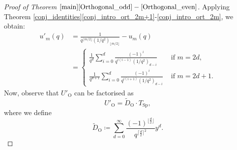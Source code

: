 \documentclass[a4paper, 12pt, oneside]{amsart}
\theoremstyle{definition}
\DeclareMathOperator{\Sp}{Sp}
\DeclareMathOperator{\Or}{O}
\begin{document}
\begin{proof}[Proof of Theorem $\ref{main}\eqref{Orthogonal_odd}-\eqref{Orthogonal_even}$]
 Applying Theorem \ref{conj_identities}\eqref{conj_intro_ort_2m+1}-\eqref{conj_intro_ort_2m}, we obtain:
\begin{align*}
u'_m(q)& =\frac{1}{q^{\lfloor m/2 \rfloor}(1/q^2)_{\lfloor m/2 \rfloor}}-u_m(q) \\
& =
\begin{cases}
 \frac{1}{q^d}\sum_{i=0}^{d}\frac{(-1)^{i}}{q^{i(i-1)}(1/q^2)_{d-i}} & \text{ if }m=2d,\\
\frac{1}{q^{d+1}}\sum_{i=0}^{d}\frac{(-1)^{i}}{q^{i(i+1)}(1/q^2)_{d-i}} & \text{ if }m=2d+1.
\end{cases}
\end{align*}
Now, observe that $U'_{\Or}$ can be factorised as 
\begin{equation}
\label{fatt_ort}
    U'_{\Or}=\widetilde{D}_{\Or}\cdot T_{\Sp},
\end{equation}
where we define
$$\widetilde{D}_{\Or} \coloneqq \sum_{d=0}^{\infty}\frac{(-1)^{\lfloor\frac{d}{2}\rfloor}}{q^{\lceil \frac{d}{2}\rceil^2}}y^d.$$


\end{proof}
\end{document}
